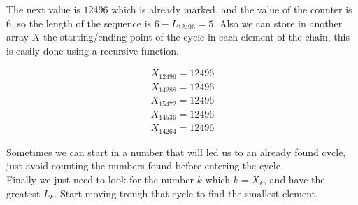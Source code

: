 The next value is $12496$ which is already marked, and the value of the counter is $6$, so the length of the sequence is $6 - L_{12496} = 5$. Also we can store in another array $X$ the starting/ending point of the cycle in each element of the chain, this is easily done using a recursive function.

\begin{align*}
    X_{12496} = 12496 \\
    X_{14288} = 12496 \\
    X_{15472} = 12496 \\
    X_{14536} = 12496 \\
    X_{14264} = 12496
\end{align*}

Sometimes we can start in a number that will led us to an already found cycle, just avoid counting the numbers found before entering the cycle.\\

Finally we just need to look for the number $k$ which $k = X_k$, and have the greatest $L_k$. Start moving trough that cycle to find the smallest element.